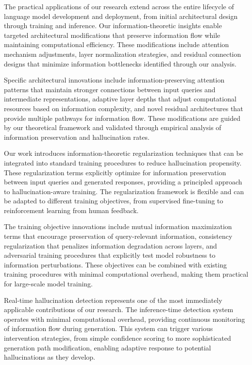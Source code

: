 The practical applications of our research extend across the entire lifecycle of language model development and deployment, from initial architectural design through training and inference. Our information-theoretic insights enable targeted architectural modifications that preserve information flow while maintaining computational efficiency. These modifications include attention mechanism adjustments, layer normalization strategies, and residual connection designs that minimize information bottlenecks identified through our analysis.

Specific architectural innovations include information-preserving attention patterns that maintain stronger connections between input queries and intermediate representations, adaptive layer depths that adjust computational resources based on information complexity, and novel residual architectures that provide multiple pathways for information flow. These modifications are guided by our theoretical framework and validated through empirical analysis of information preservation and hallucination rates.

Our work introduces information-theoretic regularization techniques that can be integrated into standard training procedures to reduce hallucination propensity. These regularization terms explicitly optimize for information preservation between input queries and generated responses, providing a principled approach to hallucination-aware training. The regularization framework is flexible and can be adapted to different training objectives, from supervised fine-tuning to reinforcement learning from human feedback.

The training objective innovations include mutual information maximization terms that encourage preservation of query-relevant information, consistency regularization that penalizes information degradation across layers, and adversarial training procedures that explicitly test model robustness to information perturbations. These objectives can be combined with existing training procedures with minimal computational overhead, making them practical for large-scale model training.

Real-time hallucination detection represents one of the most immediately applicable contributions of our research. The inference-time detection system operates with minimal computational overhead, providing continuous monitoring of information flow during generation. This system can trigger various intervention strategies, from simple confidence scoring to more sophisticated generation path modification, enabling adaptive response to potential hallucinations as they develop.

